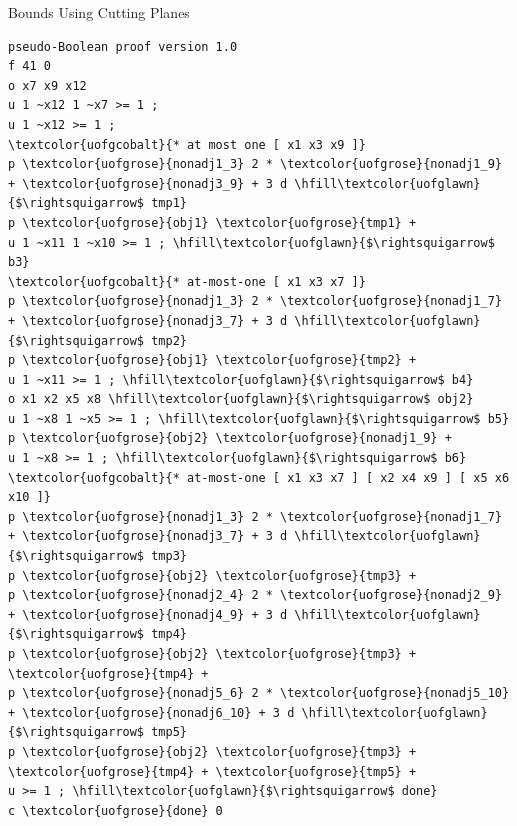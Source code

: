 \documentclass{beamer}
\begin{document}
\begin{frame}[fragile]{Bounds Using Cutting Planes}
\tiny\begin{Verbatim}[commandchars=\\\{\},codes={\catcode`$=3\catcode`^=7}]
pseudo-Boolean proof version 1.0
f 41 0
o x7 x9 x12
u 1 ~x12 1 ~x7 >= 1 ;
u 1 ~x12 >= 1 ;
\textcolor{uofgcobalt}{* at most one [ x1 x3 x9 ]}
p \textcolor{uofgrose}{nonadj1_3} 2 * \textcolor{uofgrose}{nonadj1_9} + \textcolor{uofgrose}{nonadj3_9} + 3 d \hfill\textcolor{uofglawn}{$\rightsquigarrow$ tmp1}
p \textcolor{uofgrose}{obj1} \textcolor{uofgrose}{tmp1} +
u 1 ~x11 1 ~x10 >= 1 ; \hfill\textcolor{uofglawn}{$\rightsquigarrow$ b3}
\textcolor{uofgcobalt}{* at-most-one [ x1 x3 x7 ]}
p \textcolor{uofgrose}{nonadj1_3} 2 * \textcolor{uofgrose}{nonadj1_7} + \textcolor{uofgrose}{nonadj3_7} + 3 d \hfill\textcolor{uofglawn}{$\rightsquigarrow$ tmp2}
p \textcolor{uofgrose}{obj1} \textcolor{uofgrose}{tmp2} +
u 1 ~x11 >= 1 ; \hfill\textcolor{uofglawn}{$\rightsquigarrow$ b4}
o x1 x2 x5 x8 \hfill\textcolor{uofglawn}{$\rightsquigarrow$ obj2}
u 1 ~x8 1 ~x5 >= 1 ; \hfill\textcolor{uofglawn}{$\rightsquigarrow$ b5}
p \textcolor{uofgrose}{obj2} \textcolor{uofgrose}{nonadj1_9} +
u 1 ~x8 >= 1 ; \hfill\textcolor{uofglawn}{$\rightsquigarrow$ b6}
\textcolor{uofgcobalt}{* at-most-one [ x1 x3 x7 ] [ x2 x4 x9 ] [ x5 x6 x10 ]}
p \textcolor{uofgrose}{nonadj1_3} 2 * \textcolor{uofgrose}{nonadj1_7} + \textcolor{uofgrose}{nonadj3_7} + 3 d \hfill\textcolor{uofglawn}{$\rightsquigarrow$ tmp3}
p \textcolor{uofgrose}{obj2} \textcolor{uofgrose}{tmp3} +
p \textcolor{uofgrose}{nonadj2_4} 2 * \textcolor{uofgrose}{nonadj2_9} + \textcolor{uofgrose}{nonadj4_9} + 3 d \hfill\textcolor{uofglawn}{$\rightsquigarrow$ tmp4}
p \textcolor{uofgrose}{obj2} \textcolor{uofgrose}{tmp3} + \textcolor{uofgrose}{tmp4} +
p \textcolor{uofgrose}{nonadj5_6} 2 * \textcolor{uofgrose}{nonadj5_10} + \textcolor{uofgrose}{nonadj6_10} + 3 d \hfill\textcolor{uofglawn}{$\rightsquigarrow$ tmp5}
p \textcolor{uofgrose}{obj2} \textcolor{uofgrose}{tmp3} + \textcolor{uofgrose}{tmp4} + \textcolor{uofgrose}{tmp5} +
u >= 1 ; \hfill\textcolor{uofglawn}{$\rightsquigarrow$ done}
c \textcolor{uofgrose}{done} 0
\end{Verbatim}
\end{frame}
\end{document}
